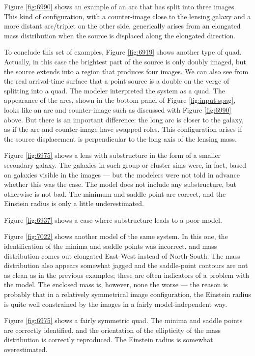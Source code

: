 Figure \ref{fig:6990} shows an example of an arc that has split into
three images.  This kind of configuration, with a counter-image close
to the lensing galaxy and a more distant arc/triplet on the other
side, generically arises from an elongated mass distribution when the
source is displaced along the elongated direction.

To conclude this set of examples, Figure \ref{fig:6919} shows another
type of quad.  Actually, in this case the brightest part of the source
is only doubly imaged, but the source extends into a region that
produces four images.  We can also see from the real arrival-time
surface that a point source is a double on the verge of splitting into
a quad.  The modeler interpreted the system as a quad.  The
appearance of the arcs, shown in the bottom panel of Figure
\ref{fig:input-spag}, looks like an arc and counter-image such as
discussed with Figure \ref{fig:6990} above.  But there is an important
difference: the long arc is closer to the galaxy, as if the arc and
counter-image have swapped roles.  This configuration arises if the
source displacement is perpendicular to the long axis of the lensing
mass.


Figure \ref{fig:6975} shows a lens with substructure in the form of a
smaller secondary galaxy.  The galaxies in such group or cluster sims
were, in fact, based on galaxies visible in the images --- but the
modelers were not told in advance whether this was the case.  The
model does not include any substructure, but otherwise is not bad.
The minimum and saddle point are correct, and the Einstein radius is
only a little underestimated.

Figure \ref{fig:6937} shows a case where substructure leads to a
poor model.


Figure \ref{fig:7022} shows another model of the same system.  In this
one, the identification of the minima and saddle points was incorrect,
and mass distribution comes out elongated East-West instead of
North-South.  The mass distribution also appears somewhat jagged and
the saddle-point contours are not as clean as in the previous
examples; these are often indicators of a problem with the model.  The
enclosed mass is, however, none the worse --- the reason is probably
that in a relatively symmetrical image configuration, the Einstein
radius is quite well constrained by the images in a fairly
model-independent way.


Figure \ref{fig:6975} shows a fairly symmetric quad.  The minima and
saddle points are correctly identified, and the orientation of the
ellipticity of the mass distribution is correctly reproduced.  The
Einstein radius is somewhat overestimated.  

